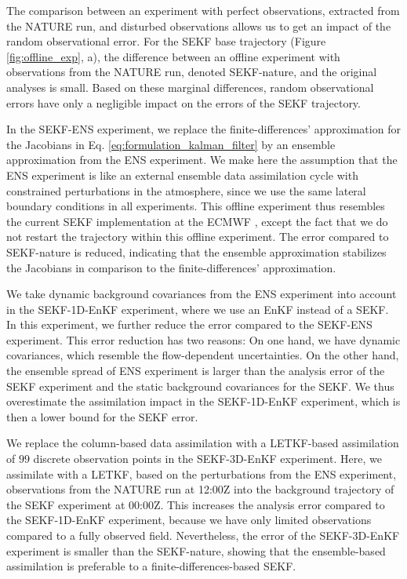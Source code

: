 \documentclass[hess, manuscript]{copernicus}
\begin{document}
The comparison between an experiment with perfect observations, extracted from the NATURE run, and disturbed observations allows us to get an impact of the random observational error.
For the SEKF base trajectory (Figure \ref{fig:offline_exp}, a), the difference between an offline experiment with observations from the NATURE run, denoted SEKF-nature, and the original analyses is small.
Based on these marginal differences, random observational errors have only a negligible impact on the errors of the SEKF trajectory.

In the SEKF-ENS experiment, we replace the finite-differences' approximation for the Jacobians in Eq. \eqref{eq:formulation_kalman_filter} by an ensemble approximation from the ENS experiment.
We make here the assumption that the ENS experiment is like an external ensemble data assimilation cycle with constrained perturbations in the atmosphere, since we use the same lateral boundary conditions in all experiments.
This offline experiment thus resembles the current SEKF implementation at the ECMWF \citep{ecmwf_ifs_2019}, except the fact that we do not restart the trajectory within this offline experiment.
The error compared to SEKF-nature is reduced, indicating that the ensemble approximation stabilizes the Jacobians in comparison to the finite-differences' approximation.

We take dynamic background covariances from the ENS experiment into account in the SEKF-1D-EnKF experiment, where we use an EnKF instead of a SEKF.
In this experiment, we further reduce the error compared to the SEKF-ENS experiment.
This error reduction has two reasons:
On one hand, we have dynamic covariances, which resemble the flow-dependent uncertainties.
On the other hand, the ensemble spread of ENS experiment is larger than the analysis error of the SEKF experiment and the static background covariances for the SEKF.
We thus overestimate the assimilation impact in the SEKF-1D-EnKF experiment, which is then a lower bound for the SEKF error.

We replace the column-based data assimilation with a LETKF-based assimilation of $99$ discrete observation points in the SEKF-3D-EnKF experiment.
Here, we assimilate with a LETKF, based on the perturbations from the ENS experiment, observations from the NATURE run at 12:00Z into the background trajectory of the SEKF experiment at 00:00Z.
This increases the analysis error compared to the SEKF-1D-EnKF experiment, because we have only limited observations compared to a fully observed field.
Nevertheless, the error of the SEKF-3D-EnKF experiment is smaller than the SEKF-nature, showing that the ensemble-based assimilation is preferable to a finite-differences-based SEKF.
\end{document}
